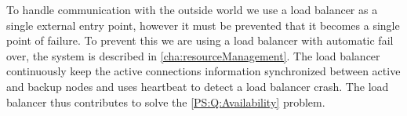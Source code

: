 To handle communication with the outside world we use a load balancer as a single external entry point, 
however it must be prevented that it becomes a single point of failure.
To prevent this we are using a load balancer with automatic fail over, the system is described in \cref{cha:resourceManagement}.
The load balancer continuously keep the active connections information synchronized between active and backup nodes and uses heartbeat to detect a load balancer crash.
The load balancer thus contributes to solve the \ref{PS:Q:Availability} problem.

\clearpage